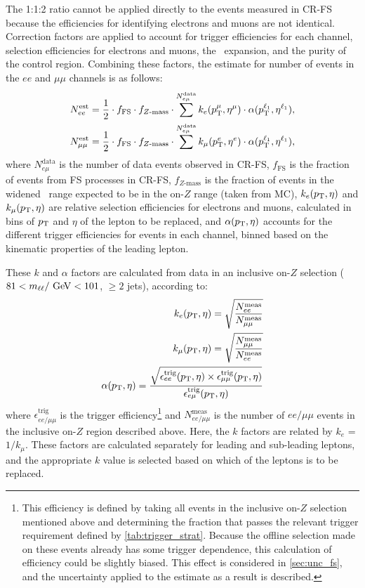 The 1:1:2 ratio cannot be applied directly to the events measured in CR-FS because the efficiencies for identifying electrons and muons are not identical. Correction factors are applied to account for trigger efficiencies for each channel, selection efficiencies for electrons and muons, the \mll~expansion, and the purity of the control region. Combining these factors, the estimate for number of events in the $ee$ and $\mu\mu$ channels is as follows:
%
\begin{eqnarray}
N_{ee}^\text{est} = \frac{1}{2} \cdot  f_{\mathrm{FS}} \cdot f_{Z \mathrm{\text{-}mass}} \cdot\sum^{N_{e\mu}^\text{data}} k_{e}(p_{\text{T}}^{\mu}, \eta^{\mu})\cdot \alpha(p_{\text{T}}^{\ell_1}, \eta^{\ell_1}) ,\\
N_{\mu\mu}^\text{est} = \frac{1}{2} \cdot  f_{\mathrm{FS}} \cdot f_{Z \mathrm{\text{-}mass}} \cdot \sum^{N_{e\mu}^\text{data}}k_{\mu}(p_{\text{T}}^{e}, \eta^{e})\cdot \alpha(p_{\text{T}}^{\ell_1}, \eta^{\ell_1}) ,
\end{eqnarray}
%
\noindent where $N_{e\mu}^\text{data}$ is the number of data events observed in CR-FS, 
$f_{\mathrm{FS}}$ is the fraction of events from \ac{FS} processes in CR-FS,  
$f_{Z \mathrm{\text{-}mass}}$ is the fraction of events in the widened \mll~range expected to be in the on-$Z$ range (taken from \ttbar \ac{MC}),
$k_{e}(p_{\text{T}}, \eta)$ and $k_{\mu}(p_{\text{T}}, \eta)$ are relative selection efficiencies for electrons and muons, calculated in bins of $p_{\text{T}}$ and $\eta$ of the lepton to be replaced, 
and $\alpha(p_{\text{T}}, \eta)$ accounts for the different trigger efficiencies for events in each channel, binned based on the kinematic properties of the leading lepton.

These $k$ and $\alpha$ factors are calculated from data in an inclusive on-$Z$ selection ($81<\mll/\GeV<101$, $\geq2$ jets), 
according to:
%
\begin{eqnarray}\label{eq:kfac}
k_{e}(p_{\text{T}}, \eta) = \sqrt{\frac{N_{ee}^{\text{meas}}}{N_{\mu\mu}^{\text{meas}}}} \\
k_{\mu}(p_{\text{T}}, \eta) = \sqrt{\frac{N_{\mu\mu}^{\text{meas}}}{N_{ee}^{\text{meas}}}} \\
\alpha(p_{\text{T}}, \eta) = \frac{\sqrt{\epsilon^\text{trig}_{ee}(p_{\text{T}},\eta)\times\epsilon^\text{trig}_{\mu\mu}(p_{\text{T}},\eta)}}{\epsilon^\text{trig}_{e\mu}(p_{\text{T}},\eta)}
\label{eq:kandalpha}
\end{eqnarray}
%
\noindent where $\epsilon^\text{trig}_{ee/\mu\mu}$ is the trigger efficiency\footnote{This efficiency is defined by taking all events in the inclusive on-$Z$ selection mentioned above and determining the fraction that passes the relevant trigger requirement defined by \autoref{tab:trigger_strat}. Because the offline selection made on these events already has some trigger dependence, this calculation of efficiency could be slightly biased. This effect is considered in \autoref{sec:unc_fs}, and the uncertainty applied to the estimate as a result is described.} 
and $N_{ee/\mu\mu}^{\text{meas}}$ 
is the number of $ee/\mu\mu$ events in the inclusive on-$Z$ region described above. 
Here, the $k$ factors are related by $k_{e}$ = $1/k_{\mu}$. These factors are calculated separately for leading and sub-leading leptons, and the appropriate $k$ value is selected based on which of the leptons is to be replaced. 

